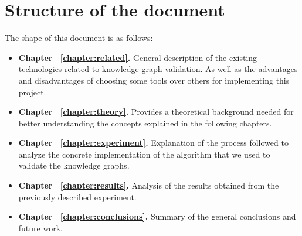 \section{Structure of the document}

The shape of this document is as follows:

\begin{itemize}
    \item \textbf{Chapter ~\ref{chapter:related}.} General description of the existing technologies related to knowledge graph validation. As well as the advantages and disadvantages of choosing some tools over others for implementing this project.
    \item \textbf{Chapter ~\ref{chapter:theory}.} Provides a theoretical background needed for better understanding the concepts explained in the following chapters.
    \item \textbf{Chapter ~\ref{chapter:experiment}.} Explanation of the process followed to analyze the concrete implementation of the algorithm that we used to validate the knowledge graphs.
    \item \textbf{Chapter ~\ref{chapter:results}.} Analysis of the results obtained from the previously described experiment.
    \item \textbf{Chapter ~\ref{chapter:conclusions}.} Summary of the general conclusions and future work.
\end{itemize}